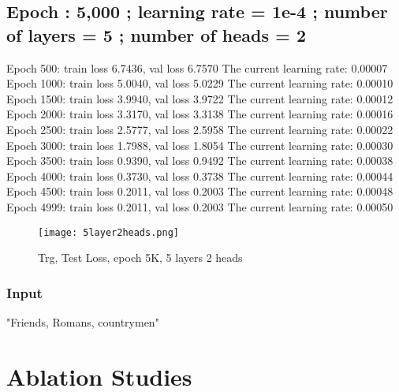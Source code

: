 \documentclass[conference]{IEEEtran}
\begin{document}
\subsection{Epoch : 5,000 ; learning rate = 1e-4 ; number of layers = 5 ; number of heads = 2}
Epoch 500: train loss 6.7436, val loss 6.7570
The current learning rate: 0.00007
Epoch 1000: train loss 5.0040, val loss 5.0229
The current learning rate: 0.00010
Epoch 1500: train loss 3.9940, val loss 3.9722
The current learning rate: 0.00012
Epoch 2000: train loss 3.3170, val loss 3.3138
The current learning rate: 0.00016
Epoch 2500: train loss 2.5777, val loss 2.5958
The current learning rate: 0.00022
Epoch 3000: train loss 1.7988, val loss 1.8054
The current learning rate: 0.00030
Epoch 3500: train loss 0.9390, val loss 0.9492
The current learning rate: 0.00038
Epoch 4000: train loss 0.3730, val loss 0.3738
The current learning rate: 0.00044
Epoch 4500: train loss 0.2011, val loss 0.2003
The current learning rate: 0.00048
Epoch 4999: train loss 0.2011, val loss 0.2003
The current learning rate: 0.00050
\begin{figure}[H]
    \centering
    \texttt{[image: 5layer2heads.png]}
    \caption{Trg, Test Loss, epoch 5K, 5 layers 2 heads}
    \label{fig:epoch}
\end{figure}
\subsubsection{Input}
"Friends, Romans, countrymen"

\section{Ablation Studies}
\end{document}

